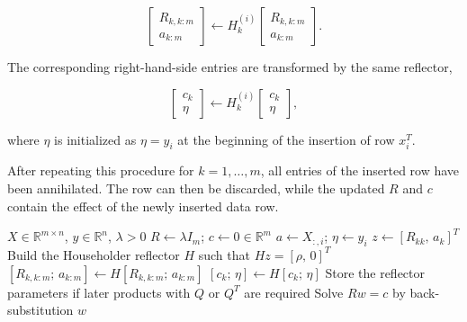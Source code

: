 \documentclass[11pt,a4paper]{article}
\newcommand{\R}{\mathbb{R}}
\begin{document}
\begin{equation}
    \begin{bmatrix}
        R_{k,k:m} \\
        a_{k:m}
    \end{bmatrix}
    \leftarrow
    H_k^{(i)}
    \begin{bmatrix}
        R_{k,k:m} \\
        a_{k:m}
    \end{bmatrix}.
\end{equation}

The corresponding right-hand-side entries are transformed by the same reflector,

\begin{equation}
    \begin{bmatrix}
        c_k \\
        \eta
    \end{bmatrix}
    \leftarrow
    H_k^{(i)}
    \begin{bmatrix}
        c_k \\
        \eta
    \end{bmatrix},
\end{equation}

where $\eta$ is initialized as $\eta=y_i$ at the beginning of the insertion of row $x_i^T$.

After repeating this procedure for $k=1,\ldots,m$, all entries of the inserted row have been annihilated. The row can then be discarded, while the updated $R$ and $c$ contain the effect of the newly inserted data row.

\begin{algorithm}[H]
\caption{Structured Householder QR for $[X^T;\lambda I_m]$}
\label{alg:structured_householder}
\begin{algorithmic}[1]
    \Require $X\in\R^{m\times n}$, $y\in\R^n$, $\lambda>0$
    \State $R \gets \lambda I_m$; \quad $c \gets 0\in\R^m$
        \State $a \gets X_{:,i}$; \quad $\eta \gets y_i$
            \State $z \gets [R_{kk},\, a_k]^T$
            \State Build the Householder reflector $H$ such that $Hz=[\rho,\,0]^T$
            \State $[R_{k,k:m};\,a_{k:m}] \gets H [R_{k,k:m};\,a_{k:m}]$
            \State $[c_k;\,\eta] \gets H[c_k;\,\eta]$
            \State Store the reflector parameters if later products with $Q$ or $Q^T$ are required
        \EndFor
    \EndFor
    \State Solve $Rw=c$ by back-substitution
    \State \Return $w$
\end{algorithmic}
\end{algorithm}
\end{document}
